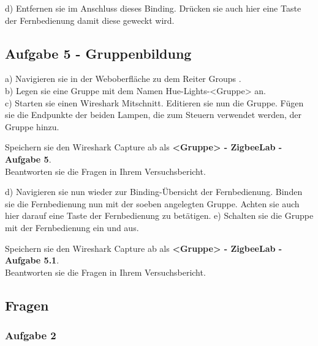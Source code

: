 d) Entfernen sie im Anschluss dieses Binding. Drücken sie auch hier eine Taste der Fernbedienung damit diese geweckt wird.

\subsection{Aufgabe 5 - Gruppenbildung}

a) Navigieren sie in der Weboberfläche zu dem Reiter \grqq Groups \grqq{}. \\
b) Legen sie eine Gruppe mit dem Namen \grqq Hue-Lights-<Gruppe> \grqq{} an.\\
c) Starten sie einen Wireshark Mitschnitt. Editieren sie nun die Gruppe. Fügen sie die Endpunkte der beiden Lampen, die zum Steuern verwendet werden, der Gruppe hinzu. \\


\begin{Aufgabe}
    Speichern sie den Wireshark Capture ab als \textbf{\grqq <Gruppe> - ZigbeeLab - Aufgabe 5\grqq{}}. \\
    Beantworten sie die Fragen in Ihrem Versuchsbericht.
\end{Aufgabe}

d) Navigieren sie nun wieder zur Binding-Übersicht der Fernbedienung. Binden sie die Fernbedienung nun mit der soeben
angelegten Gruppe. Achten sie auch hier darauf eine Taste der Fernbedienung zu betätigen.
e) Schalten sie die Gruppe mit der Fernbedienung ein und aus.

\begin{Aufgabe}
    Speichern sie den Wireshark Capture ab als \textbf{\grqq <Gruppe> - ZigbeeLab - Aufgabe 5.1\grqq{}}. \\
    Beantworten sie die Fragen in Ihrem Versuchsbericht.
\end{Aufgabe}

\subsection{Fragen}
\subsubsection{Aufgabe 2}

